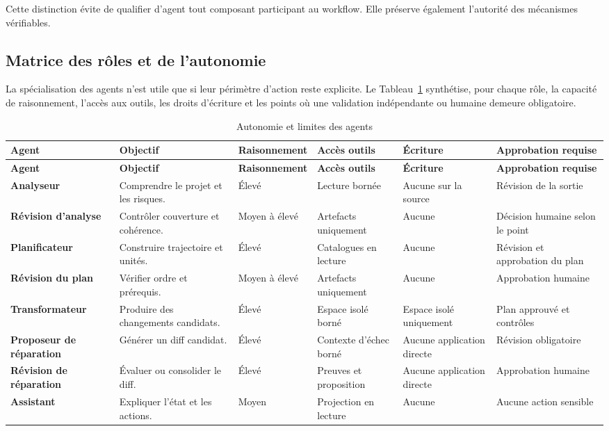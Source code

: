 Cette distinction évite de qualifier d'agent tout composant participant au workflow. Elle préserve également l'autorité des mécanismes vérifiables.

\subsection{Matrice des rôles et de l'autonomie}

La spécialisation des agents n'est utile que si leur périmètre d'action reste explicite. Le Tableau~\ref{tab:autonomie-agents-ch3} synthétise, pour chaque rôle, la capacité de raisonnement, l'accès aux outils, les droits d'écriture et les points où une validation indépendante ou humaine demeure obligatoire.

\scriptsize
\begin{longtable}{|>{\bfseries\RaggedRight\arraybackslash}p{2.7cm}|>{\RaggedRight\arraybackslash}p{3.2cm}|>{\centering\arraybackslash}p{2.2cm}|>{\centering\arraybackslash}p{2.2cm}|>{\centering\arraybackslash}p{2.2cm}|>{\RaggedRight\arraybackslash}p{2.7cm}|}
    \caption{Autonomie et limites des agents}\label{tab:autonomie-agents-ch3}\\
    \hline
    \rowcolor{cgilight!95}
    \textbf{Agent} & \textbf{Objectif} & \textbf{Raisonnement} & \textbf{Accès outils} & \textbf{Écriture} & \textbf{Approbation requise} \\
    \hline
    \endfirsthead
    \hline
    \rowcolor{cgilight!95}
    \textbf{Agent} & \textbf{Objectif} & \textbf{Raisonnement} & \textbf{Accès outils} & \textbf{Écriture} & \textbf{Approbation requise} \\
    \hline
    \endhead
    Analyseur & Comprendre le projet et les risques. & Élevé & Lecture bornée & Aucune sur la source & Révision de la sortie \\
    \hline
    Révision d'analyse & Contrôler couverture et cohérence. & Moyen à élevé & Artefacts uniquement & Aucune & Décision humaine selon le point \\
    \hline
    Planificateur & Construire trajectoire et unités. & Élevé & Catalogues en lecture & Aucune & Révision et approbation du plan \\
    \hline
    Révision du plan & Vérifier ordre et prérequis. & Moyen à élevé & Artefacts uniquement & Aucune & Approbation humaine \\
    \hline
    Transformateur & Produire des changements candidats. & Élevé & Espace isolé borné & Espace isolé uniquement & Plan approuvé et contrôles \\
    \hline
    Proposeur de réparation & Générer un diff candidat. & Élevé & Contexte d'échec borné & Aucune application directe & Révision obligatoire \\
    \hline
    Révision de réparation & Évaluer ou consolider le diff. & Élevé & Preuves et proposition & Aucune application directe & Approbation humaine \\
    \hline
    Assistant & Expliquer l'état et les actions. & Moyen & Projection en lecture & Aucune & Aucune action sensible \\
    \hline
\end{longtable}
\normalsize

